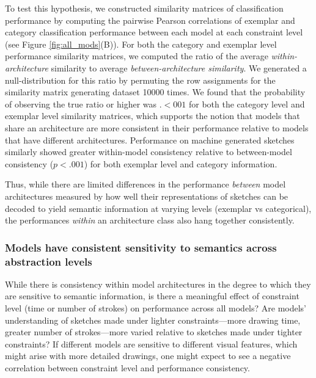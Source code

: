 \documentclass[10pt,letterpaper]{article}
\begin{document}
To test this hypothesis, we constructed similarity matrices of classification performance by computing the pairwise Pearson correlations of exemplar and category classification performance between each model at each constraint level (see Figure \ref{fig:all_mods}(B)).
For both the category and exemplar level performance similarity matrices, we computed the ratio of the average \textit{within-architecture} similarity to average \textit{between-architecture similarity}. We generated a null-distribution for this ratio by permuting the row assignments for the similarity matrix generating dataset 10000 times. We found that the probability of observing the true ratio or higher was $.<001$ for both the category level and exemplar level similarity matrices, which supports the notion that models that share an architecture are more consistent in their performance relative to models that have different architectures. Performance on machine generated sketches similarly showed greater within-model consistency relative to between-model consistency ($p<.001$) for both exemplar level and category information.

Thus, while there are limited differences in the performance \textit{between} model architectures measured by how well their representations of sketches can be decoded to yield semantic information at varying levels (exemplar vs categorical), the performances \textit{within} an architecture class also hang together consistently.

\subsubsection{Models have consistent sensitivity to semantics across abstraction levels}

While there is consistency within model architectures in the degree to which they are sensitive to semantic information, is there a meaningful effect of constraint level (time or number of strokes) on performance across all models? 
 Are models' understanding of sketches made under lighter constraints—more drawing time, greater number of strokes—more varied relative to sketches made under tighter constraints? If different models are sensitive to different visual features, which might arise with more detailed drawings, one might expect to see a negative correlation between constraint level and performance consistency.
\end{document}
